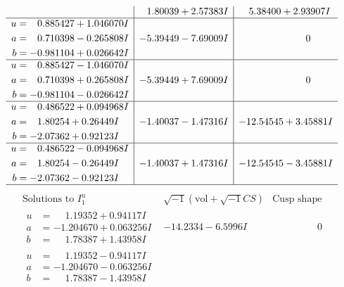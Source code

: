 \documentclass[1p]{elsarticle_modified}
\theoremstyle{definition}
\newcommand{\I}{\sqrt{-1}}
\begin{document}
$$\begin{array}{c|c|c}
 & \phantom{-}1.80039 + 2.57383 I & \phantom{-}5.38400 + 2.93907 I \\ \hline\begin{aligned}
u &= \phantom{-}0.885427 + 1.046070 I \\
a &= \phantom{-}0.710398 - 0.265808 I \\
b &= -0.981104 + 0.026642 I\end{aligned}
 & -5.39449 - 7.69009 I & \phantom{-0.000000 } 0 \\ \hline\begin{aligned}
u &= \phantom{-}0.885427 - 1.046070 I \\
a &= \phantom{-}0.710398 + 0.265808 I \\
b &= -0.981104 - 0.026642 I\end{aligned}
 & -5.39449 + 7.69009 I & \phantom{-0.000000 } 0 \\ \hline\begin{aligned}
u &= \phantom{-}0.486522 + 0.094968 I \\
a &= \phantom{-}1.80254 + 0.26449 I \\
b &= -2.07362 + 0.92123 I\end{aligned}
 & -1.40037 - 1.47316 I & -12.54545 + 3.45881 I \\ \hline\begin{aligned}
u &= \phantom{-}0.486522 - 0.094968 I \\
a &= \phantom{-}1.80254 - 0.26449 I \\
b &= -2.07362 - 0.92123 I\end{aligned}
 & -1.40037 + 1.47316 I & -12.54545 - 3.45881 I\\
 \hline 
 \end{array}$$\newpage$$\begin{array}{c|c|c}  
\text{Solutions to }I^u_{1}& \I (\text{vol} + \sqrt{-1}CS) & \text{Cusp shape}\\
 \hline 
\begin{aligned}
u &= \phantom{-}1.19352 + 0.94117 I \\
a &= -1.204670 + 0.063256 I \\
b &= \phantom{-}1.78387 + 1.43958 I\end{aligned}
 & -14.2334 - 6.5996 I & \phantom{-0.000000 } 0 \\ \hline\begin{aligned}
u &= \phantom{-}1.19352 - 0.94117 I \\
a &= -1.204670 - 0.063256 I \\
b &= \phantom{-}1.78387 - 1.43958 I\end{aligned}

\end{array}$$
\end{document}
